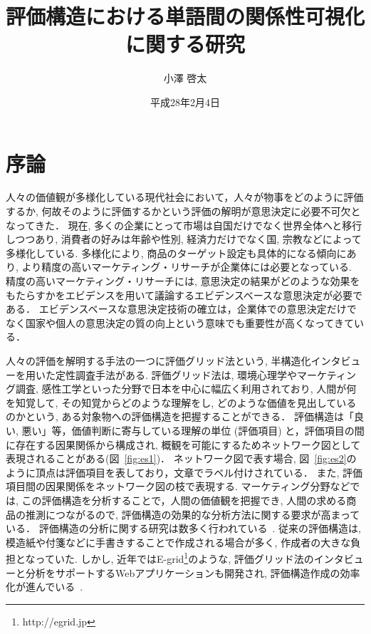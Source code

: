 \documentclass[syuuron]{kuee}
\title{評価構造における単語間の関係性可視化に関する研究}
\author{小澤 啓太}
\date{平成28年2月4日}
\begin{document}
\maketitle
\tableofcontents


\chapter{序論}
	人々の価値観が多様化している現代社会において，人々が物事をどのように評価するか, 
	何故そのように評価するかという評価の解明が意思決定に必要不可欠となってきた．
	現在, 多くの企業にとって市場は自国だけでなく世界全体へと移行しつつあり, 
	消費者の好みは年齢や性別, 経済力だけでなく国, 宗教などによって多様化している. 
	多様化により, 商品のターゲット設定も具体的になる傾向にあり, より精度の高いマーケティング・リサーチが企業体には必要となっている. 
	精度の高いマーケティング・リサーチには, 意思決定の結果がどのような効果をもたらすかをエビデンスを用いて議論するエビデンスベースな意思決定が必要である．
	エビデンスベースな意思決定技術の確立は，企業体での意思決定だけでなく国家や個人の意思決定の質の向上という意味でも重要性が高くなってきている．
	
	人々の評価を解明する手法の一つに評価グリッド法という, 半構造化インタビューを用いた定性調査手法がある. 
	評価グリッド法は, 環境心理学やマーケティング調査, 感性工学といった分野で日本を中心に幅広く利用されており, 
	人間が何を知覚して, その知覚からどのような理解をし, どのような価値を見出しているのかという, ある対象物への評価構造を把握することができる\cite{sen1}．
	評価構造は「良い, 悪い」等，価値判断に寄与している理解の単位 (評価項目) と，評価項目の間に存在する因果関係から構成され, 
	概観を可能にするためネットワーク図として表現されることがある(図~\ref{fig:es1})．
	ネットワーク図で表す場合, 図~\ref{fig:es2}のように頂点は評価項目を表しており，文章でラベル付けされている．
	また, 評価項目間の因果関係をネットワーク図の枝で表現する. 
	マーケティング分野などでは, この評価構造を分析することで，人間の価値観を把握でき, 人間の求める商品の推測につながるので, 
	評価構造の効果的な分析方法に関する要求が高まっている\cite{egm6, egm7}．
	評価構造の分析に関する研究は数多く行われている~\cite{egm8, egm9}. 
	従来の評価構造は, 模造紙や付箋などに手書きすることで作成される場合が多く, 作成者の大きな負担となっていた. 
	しかし, 近年ではE-grid\footnote{http://egrid.jp}のような, 評価グリッド法のインタビューと分析をサポートするWebアプリケーションも開発され, 評価構造作成の効率化が進んでいる~\cite{egm6, egm10}. 
	
\end{document}
